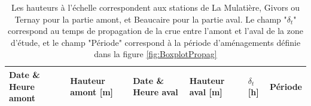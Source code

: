 \documentclass[11pt]{article}
\begin{document}
\centering
\begin{longtable}{|l|p{2.3cm}|l|p{2.3cm}|l|l|}
	\caption{Les hauteurs à l'échelle correspondent aux stations de La Mulatière, Givors ou Ternay pour la partie amont, et Beaucaire pour la partie aval. Le champ "$\delta_t$" correspond au temps de propagation de la crue entre l'amont et l'aval de la zone d'étude, et le champ "Période" correspond à la période d'aménagements définie dans la figure \ref{fig:BoxplotPropag}}
	\label{tab:Propag}\\

        \hline
        \textbf{Date \& Heure amont} & \textbf{Hauteur amont [m]} & \textbf{Date \& Heure aval} & \textbf{Hauteur aval [m]} & \textbf{$\delta_t$[h]} & \textbf{Période} \\ \hline
        

\end{longtable}
\end{document}
